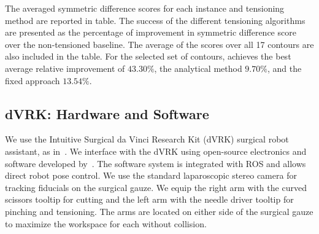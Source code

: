 The averaged symmetric difference scores for each instance  and tensioning method are reported in table.  
The success of the different tensioning algorithms are presented as the percentage of improvement in symmetric difference score over the non-tensioned baseline. 
The average of the scores over all 17 contours are also included in the table.   
For the selected set of contours, \tpsalgo achieves the best average relative improvement of $43.30\%$, the analytical method $9.70\%$, and the fixed approach $13.54\%$.

\subsection*{dVRK: Hardware and Software}
We use the Intuitive Surgical da Vinci Research Kit (dVRK) surgical robot assistant, as in~\cite{murali2015learning,sen2015automating,garg2016gpas}. We interface with the dVRK using open-source electronics and software developed by~\cite{Kazanzides2014}. The software system is integrated with ROS and allows direct robot pose control.
We use the standard laparoscopic stereo camera for tracking fiducials on the surgical gauze. We equip the right arm with the curved scissors tooltip for cutting and the left arm with the needle driver tooltip for pinching and tensioning. The arms are located on either side of the surgical gauze to maximize the workspace for each without collision.
